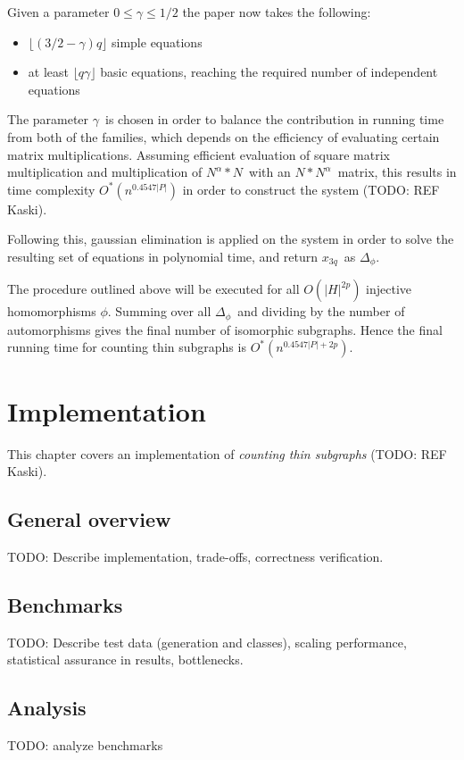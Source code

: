 \documentclass[a4paper,11pt]{report}
\theoremstyle{plain}
\theoremstyle{definition}
\begin{document}
Given a parameter $0 \leq \gamma \leq 1/2$ the paper now takes the following:
\begin{itemize}
\item $\lfloor (3/2 - \gamma)q \rfloor$ simple equations
\item at least $\lfloor q \gamma \rfloor$ basic equations, reaching the required number of independent equations
\end{itemize}

The parameter $\gamma$ is chosen in order to balance the contribution in running time from both of the families, which depends on the efficiency of evaluating certain matrix multiplications.
Assuming efficient evaluation of square matrix multiplication and multiplication of $N^\alpha * N$ with an $N * N^\alpha$ matrix, this results in time complexity $O^*(n^{0.4547|P|})$ in order to construct the system (TODO: REF Kaski).

Following this, gaussian elimination is applied on the system in order to solve the resulting set of equations in polynomial time, and return $x_{3q}$ as $\Delta_\phi$.

The procedure outlined above will be executed for all $O(|H|^{2p})$ injective homomorphisms $\phi$.
Summing over all $\Delta_\phi$ and dividing by the number of automorphisms gives the final number of isomorphic subgraphs.
Hence the final running time for counting thin subgraphs is $O^*(n^{0.4547|P| + 2p})$.

\chapter{Implementation}
This chapter covers an implementation of \emph{counting thin subgraphs} (TODO: REF Kaski).

\section{General overview}
TODO: Describe implementation, trade-offs, correctness verification.

\section{Benchmarks}
TODO: Describe test data (generation and classes), scaling performance,
statistical assurance in results, bottlenecks.

\section{Analysis}
TODO: analyze benchmarks
\end{document}
